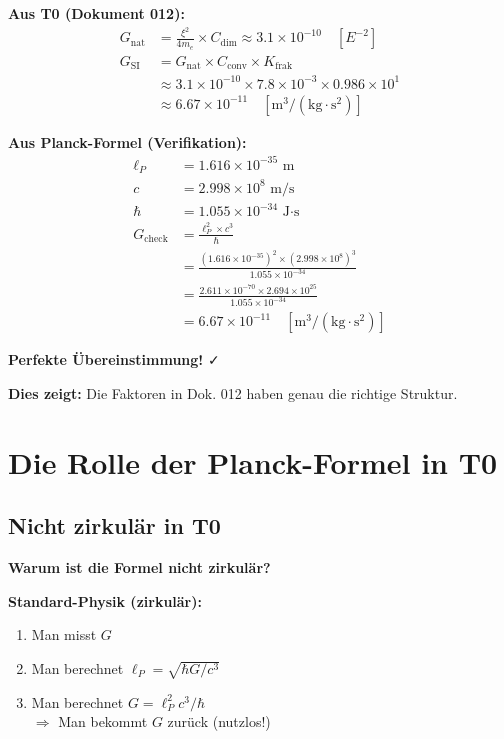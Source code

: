 	\begin{verification}
		\textbf{Aus T0 (Dokument 012):}
		\begin{align}
			G_{\text{nat}} &= \frac{\xi^2}{4m_e} \times C_{\text{dim}} \approx 3.1 \times 10^{-10} \quad [E^{-2}] \\
			G_{\text{SI}} &= G_{\text{nat}} \times C_{\text{conv}} \times K_{\text{frak}} \\
			&\approx 3.1 \times 10^{-10} \times 7.8 \times 10^{-3} \times 0.986 \times 10^{1} \\
			&\approx 6.67 \times 10^{-11} \quad [\text{m}^3/(\text{kg} \cdot \text{s}^2)]
		\end{align}
		
		\textbf{Aus Planck-Formel (Verifikation):}
		\begin{align}
			\ell_P &= 1.616 \times 10^{-35} \text{ m} \\
			c &= 2.998 \times 10^8 \text{ m/s} \\
			\hbar &= 1.055 \times 10^{-34} \text{ J·s} \\
			G_{\text{check}} &= \frac{\ell_P^2 \times c^3}{\hbar} \\
			&= \frac{(1.616 \times 10^{-35})^2 \times (2.998 \times 10^8)^3}{1.055 \times 10^{-34}} \\
			&= \frac{2.611 \times 10^{-70} \times 2.694 \times 10^{25}}{1.055 \times 10^{-34}} \\
			&= 6.67 \times 10^{-11} \quad [\text{m}^3/(\text{kg} \cdot \text{s}^2)]
		\end{align}
		
		\textbf{Perfekte Übereinstimmung!} ✓
		
		\textbf{Dies zeigt:} Die Faktoren in Dok. 012 haben genau die richtige Struktur.
	\end{verification}
	
	\section{Die Rolle der Planck-Formel in T0}
	
	\subsection{Nicht zirkulär in T0}
	
	\textbf{Warum ist die Formel nicht zirkulär?}
	
	\textbf{Standard-Physik (zirkulär):}
	\begin{enumerate}
		\item Man misst $G$
		\item Man berechnet $\ell_P = \sqrt{\hbar G / c^3}$
		\item Man berechnet $G = \ell_P^2 c^3 / \hbar$ \\
		$\Rightarrow$ Man bekommt $G$ zurück (nutzlos!)
	\end{enumerate}
	
